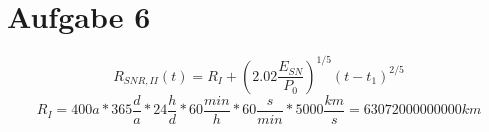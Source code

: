 \section{Aufgabe 6}
\begin{equation}
R_{SNR,II}(t)=R_I + \left( 2.02 \frac{E_{SN}}{P_0} \right) ^{1/5}(t-t_1)^{2/5}
\end{equation}
\begin{equation}
R_I=400 a * 365 \frac{d}{a} * 24 \frac{h}{d} * 60 \frac{min}{h} * 60 \frac{s}{min} * 5000 \frac{km}{s} = 63072000000000 km
\end{equation}
